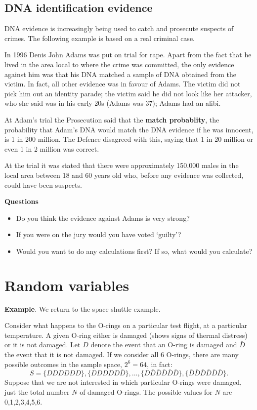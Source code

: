 \documentclass[
  british,
]{book}
\providecommand{\tightlist}{%
  \setlength{\itemsep}{0pt}\setlength{\parskip}{0pt}}
\begin{document}
\hypertarget{dna-identification-evidence}{%
\section{DNA identification evidence}\label{dna-identification-evidence}}

DNA evidence is increasingly being used to catch and prosecute suspects of crimes. The following example is based on a real criminal case.

In 1996 Denis John Adams was put on trial for rape. Apart from the fact that he lived in the area local to where the crime was committed, the only evidence against him was that his DNA matched a sample of DNA obtained from the victim.
In fact, all other evidence was in favour of Adams. The victim did not pick him out an identity parade; the victim said he did not look like her attacker, who she said was in his early 20s (Adams was 37); Adams had an alibi.

At Adam's trial the Prosecution said that the \textbf{match probablity}, the probability that Adam's DNA would match the DNA evidence if he was innocent, is 1 in 200 million. The Defence disagreed with this, saying that 1 in 20 million or even 1 in 2 million was correct.

At the trial it was stated that there were approximately 150,000 males in the local area between 18 and 60 years old who, before any evidence was collected, could have been suspects.

\textbf{Questions}

\begin{itemize}
\tightlist
\item
  Do you think the evidence against Adams is very strong?
\item
  If you were on the jury would you have voted `guilty'?
\item
  Would you want to do any calculations first? If so, what would you calculate?
\end{itemize}

\FloatBarrier

\hypertarget{rvs}{%
\chapter{Random variables}\label{rvs}}

\textbf{Example}. We return to the space shuttle example.

Consider what happens to the O-rings on a particular test flight, at a particular temperature. A given O-ring either is damaged (shows signs of thermal distress) or it is not damaged. Let \(D\) denote the event that an O-ring is damaged and \(\bar{D}\) the event that it is not damaged. If we consider all 6 O-rings, there are many possible outcomes in the sample space, \(2^6=64\), in fact:
\[ S= \{DDDDDD\}, \{DDDDD\bar{D}\}, \ldots, \{D\bar{D}\bar{D}\bar{D}\bar{D}\bar{D}\}, 
\{\bar{D}\bar{D}\bar{D}\bar{D}\bar{D}\bar{D}\}. \]
Suppose that we are not interested in which particular O-rings were damaged, just the total number \(N\) of damaged O-rings. The possible values for \(N\) are 0,1,2,3,4,5,6.
\end{document}
